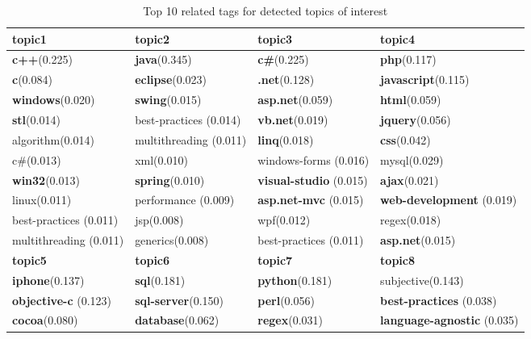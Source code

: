\begin{table}[htbp]
\tiny
\caption{Top 10 related tags for detected topics of interest}
\label{tab:ldaresult1}
\centering
\begin{tabular}{|p{40pt}||p{40pt}||p{40pt}||p{40pt}|}
\hline
\textbf{topic1} & \textbf{topic2} & \textbf{topic3} & \textbf{topic4} \\
\hline
 \textbf{c++}(0.225)& \textbf{java}(0.345)& \textbf{c\#}(0.225)& \textbf{php}(0.117) \\ 
\hline
 \textbf{c}(0.084)& \textbf{eclipse}(0.023)& \textbf{.net}(0.128)& \textbf{javascript}(0.115) \\ 
\hline
 \textbf{windows}(0.020)& \textbf{swing}(0.015)& \textbf{asp.net}(0.059)& \textbf{html}(0.059) \\ 
\hline
 \textbf{stl}(0.014)& best-practices (0.014)& \textbf{vb.net}(0.019)& \textbf{jquery}(0.056) \\ 
\hline
 algorithm(0.014)& multithreading (0.011)& \textbf{linq}(0.018)& \textbf{css}(0.042) \\ 
\hline
 c\#(0.013)& xml(0.010)& windows-forms (0.016)& mysql(0.029) \\ 
\hline
 \textbf{win32}(0.013)& \textbf{spring}(0.010)& \textbf{visual-studio} (0.015)& \textbf{ajax}(0.021) \\ 
\hline
 linux(0.011)& performance (0.009)& \textbf{asp.net-mvc} (0.015)& \textbf{web-development} (0.019) \\ 
\hline
 best-practices (0.011)& jsp(0.008)& wpf(0.012)& regex(0.018) \\ 
\hline
 multithreading (0.011)& generics(0.008)& best-practices (0.011)& \textbf{asp.net}(0.015) \\ 
\hline
\hline
\textbf{topic5} & \textbf{topic6} & \textbf{topic7} & \textbf{topic8} \\
\hline
 \textbf{iphone}(0.137)& \textbf{sql}(0.181)& \textbf{python}(0.181)& subjective(0.143) \\ 
\hline
 \textbf{objective-c} (0.123)& \textbf{sql-server}(0.150)& \textbf{perl}(0.056)& \textbf{best-practices} (0.038) \\ 
\hline
 \textbf{cocoa}(0.080)& \textbf{database}(0.062)& \textbf{regex}(0.031)& \textbf{language-agnostic} (0.035) \\ 

\end{tabular}
\end{table}
